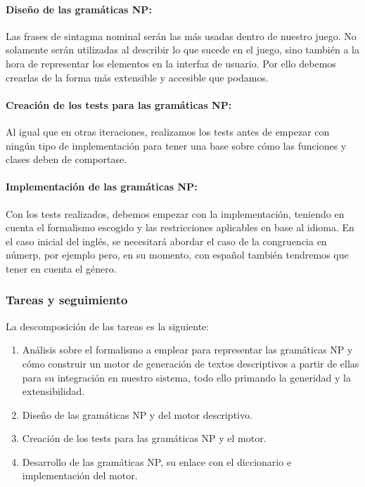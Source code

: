 \paragraph{Diseño de las gramáticas NP:} Las frases de sintagma nominal serán las más usadas dentro de nuestro juego. No solamente serán utilizadas al describir lo que sucede en el juego, sino también a la hora de representar los elementos en la interfaz de usuario. Por ello debemos crearlas de la forma más extensible y accesible que podamos.

\paragraph{Creación de los tests para las gramáticas NP:} Al igual que en otras iteraciones, realizamos los tests antes de empezar con ningún tipo de implementación para tener una base sobre cómo las funciones y clases deben de comportase.

\paragraph{Implementación de las gramáticas NP:} Con los tests realizados, debemos empezar con la implementación, teniendo en cuenta el formalismo escogido y las restricciones aplicables en base al idioma. En el caso inicial del inglés, se necesitará abordar el caso de la congruencia en númerp, por ejemplo pero, en su momento, con español también tendremos que tener en cuenta el género.

\subsubsection{Tareas y seguimiento}

La descomposición de las tareas es la siguiente:

\begin{enumerate}[label=\bfseries WBS 4.\arabic*]
  \item Análisis sobre el formalismo a emplear para representar las gramáticas NP y cómo construir un motor de generación de textos descriptivos a partir de ellas para su integración en nuestro sistema, todo ello primando la generidad y la extensibilidad.
  \item Diseño de las gramáticas NP y del motor descriptivo.
  \item Creación de los tests para las gramáticas NP y el motor.
  \item Desarrollo de las gramáticas NP, su enlace con el diccionario e implementación del motor.
\end{enumerate}

